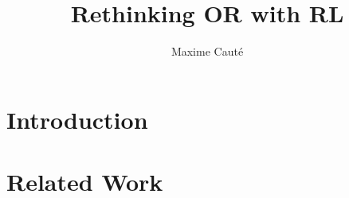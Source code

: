 \documentclass{article}
\title{Rethinking OR with RL}
\author{Maxime Cauté}
\begin{document}
\section{Introduction}

\section{Related Work}
\end{document}
